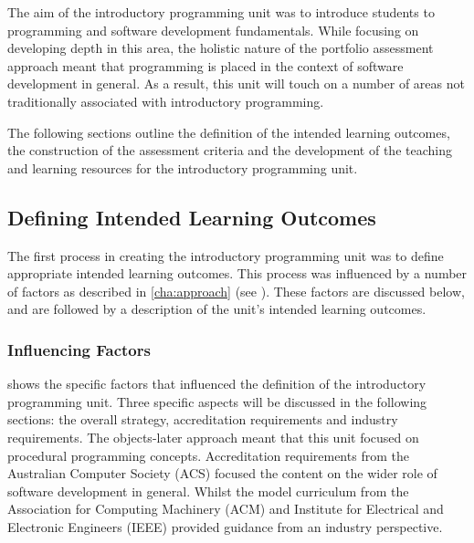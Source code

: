 The aim of the introductory programming unit was to introduce students to programming and software development fundamentals. While focusing on developing depth in this area, the holistic nature of the portfolio assessment approach meant that programming is placed in the context of software development in general. As a result, this unit will touch on a number of areas not traditionally associated with introductory programming.

The following sections outline the definition of the intended learning outcomes, the construction of the assessment criteria and the development of the teaching and learning resources for the introductory programming unit.


\subsection{Defining Intended Learning Outcomes} %
\label{sec:intro:intended_learning_outcomes}

The first process in creating the introductory programming unit was to define appropriate intended learning outcomes. This process was influenced by a number of factors as described in \cref{cha:approach} (see ). These factors are discussed below, and are followed by a description of the unit's intended learning outcomes.

\subsubsection{Influencing Factors} %
\label{ssub:influencing_factors}

 shows the specific factors that influenced the definition of the introductory programming unit. Three specific aspects will be discussed in the following sections: the overall strategy, accreditation requirements and industry requirements. The objects-later approach meant that this unit focused on procedural programming concepts. Accreditation requirements from the Australian Computer Society (ACS) focused the content on the wider role of software development in general. Whilst the model curriculum from the Association for Computing Machinery (ACM) and Institute for Electrical and Electronic Engineers (IEEE) provided guidance from an industry perspective.

